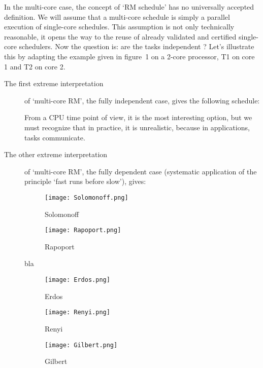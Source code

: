 \documentclass[a4paper]{article}
\begin{document}
In the multi-core case, the concept of `RM schedule' has no universally accepted definition.
We will assume that a multi-core schedule is simply a parallel execution of single-core schedules.
This assumption is not only technically reasonable, it opens the way to the reuse of already validated and certified single-core schedulers.
Now the question is: are the tasks independent ?
Let's illustrate this by adapting the example given in figure~1 on a 2-core processor, T1 on core 1 and T2 on core 2.
\begin{description}
\item[The first extreme interpretation]
of `multi-core RM', the fully independent case, gives the following schedule:





From a CPU time point of view, it is the most interesting option, but we must recognize that in practice, it is unrealistic,
because in applications, tasks communicate.
\item[The other extreme interpretation]
of `multi-core RM', the fully dependent case (systematic application of the principle `fast runs before slow'), gives:

\begin{figure}[h]
  \centering
  \begin{minipage}[b]{0.45\textwidth}
    \texttt{[image: Solomonoff.png]}
    \caption{Solomonoff}
  \end{minipage}
  \hfill
  \begin{minipage}[b]{0.45\textwidth}
    \texttt{[image: Rapoport.png]}
    \caption{Rapoport}
  \end{minipage}
\end{figure}

bla

\begin{figure}[h]
  \centering
  \begin{minipage}[b]{0.45\textwidth}
    \texttt{[image: Erdos.png]}
    \caption{Erdos}
  \end{minipage}
  \hfill
  \begin{minipage}[b]{0.45\textwidth}
    \texttt{[image: Renyi.png]}
    \caption{Renyi}
  \end{minipage}
 \hfill
  \begin{minipage}[b]{0.45\textwidth}
    \texttt{[image: Gilbert.png]}
    \caption{Gilbert}
  \end{minipage}
\end{figure}





\end{description}
\end{document}
